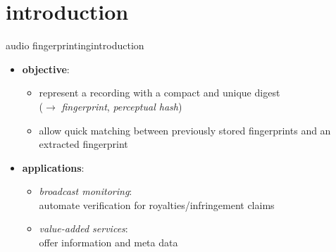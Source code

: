     \section[intro]{introduction}
       \begin{frame}{audio fingerprinting}{introduction}
            \begin{itemize}
                \item	\textbf{objective}: 
                    \begin{itemize}
                        \item   represent a recording with a compact and unique digest\\ ($\rightarrow$ \textit{fingerprint}, \textit{perceptual hash})
                        
                        \bigskip
                        \item<2->   allow quick matching between previously stored fingerprints and an extracted fingerprint
                    \end{itemize}
                \bigskip
                \item<3->	\textbf{applications}:
                    \begin{itemize}
                        \item	\textit{broadcast monitoring}:\\ automate verification for royalties/infringement claims
                        \item	\textit{value-added services}:\\ offer information and meta data
                    \end{itemize}
            \end{itemize}
        \end{frame}
        
